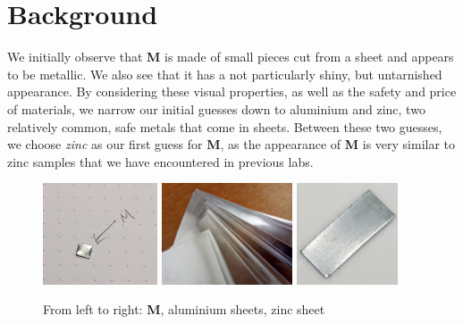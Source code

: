 \documentclass[titlepage]{article}
\begin{document}
\section{Background}
We initially observe that \textbf{M} is made of small pieces cut from a sheet and appears to be metallic. We also see that it has a not particularly shiny, but untarnished appearance. By considering these visual properties, as well as the safety and price of materials, we narrow our initial guesses down to aluminium and zinc, two relatively common, safe metals that come in sheets. Between these two guesses, we choose \emph{zinc} as our first guess for \textbf{M}, as the appearance of \textbf{M} is very similar to zinc samples that we have encountered in previous labs.
\begin{figure}[h]
    \centering
    \includegraphics[height=3cm]{unknown_M.jpg}
    \includegraphics[height=3cm]{aluminium_sheet.jpg}
    \includegraphics[height=3cm]{zinc_sheet.jpg}
    \caption{From left to right: \textbf{M}, aluminium sheets, zinc sheet}
    \label{fig:m_comparison}
\end{figure}
\end{document}
